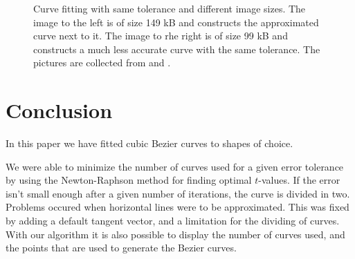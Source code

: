 \documentclass[10pt]{article}
\begin{document}
\begin{figure}
\begin{minipage}[t]{.24\textwidth}
\end{minipage}\hfill
\caption{Curve fitting with same tolerance and different image sizes. The image to the left is of size 149 kB and constructs the approximated curve next to it. The image to rhe right is of size 99 kB and constructs a much less accurate curve with the same tolerance. The pictures are collected from \cite{pic:mickey1} and \cite{pic:mickey2}.}
\label{fig:mickey}
\end{figure}






\section*{Conclusion}
In this paper we have fitted cubic Bezier curves to shapes of choice.

We were able to minimize the number of curves used for a given error tolerance by using the Newton-Raphson method for finding optimal $t$-values. If the error isn't small enough after a given number of iterations, the curve is divided in two. Problems occured when horizontal lines were to be approximated. This was fixed by adding a default tangent vector, and a limitation for the dividing of curves. With our algorithm it is also possible to display the number of curves used, and the points that are used to generate the Bezier curves.




\end{document}
